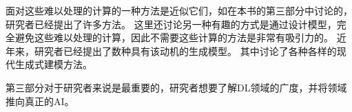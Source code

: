 面对这些难以处理的计算的一种方法是近似它们，如在本书的第三部分中讨论的，研究者已经提出了许多方法。
这里还讨论另一种有趣的方式是通过设计模型，完全避免这些难以处理的计算，因此不需要这些计算的方法是非常有吸引力的。
近年来，研究者已经提出了数种具有该动机的生成模型。
其中讨论了各种各样的现代生成式建模方法。

第三部分对于研究者来说是最重要的，研究者想要了解\gls{DL}领域的广度，并将领域推向真正的\gls{AI}。











